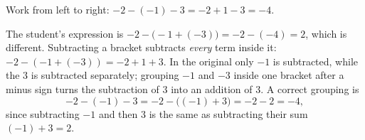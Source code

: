 Work from left to right: $-2-(-1)-3=-2+1-3=\boxed{-4}$.

The student's expression is $-2-\bigl(-1+(-3)\bigr)=-2-(-4)=2$, which is different. Subtracting a bracket subtracts \emph{every} term inside it: $-2-(-1+(-3))=-2+1+3$. In the original only $-1$ is subtracted, while the $3$ is subtracted separately; grouping $-1$ and $-3$ inside one bracket after a minus sign turns the subtraction of $3$ into an addition of $3$. A correct grouping is
\[
-2-(-1)-3=-2-\bigl((-1)+3\bigr)=-2-2=-4 ,
\]
since subtracting $-1$ and then $3$ is the same as subtracting their sum $(-1)+3=2$.
